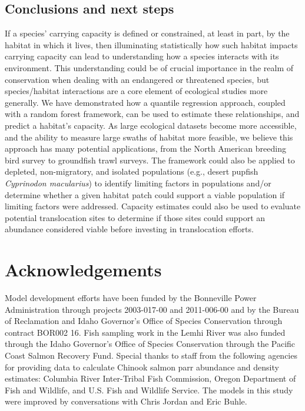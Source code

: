 \documentclass[
  12pt,
]{article}
\begin{document}
\hypertarget{conclusions-and-next-steps}{%
\subsection{Conclusions and next steps}\label{conclusions-and-next-steps}}

If a species' carrying capacity is defined or constrained, at least in part, by the habitat in which it lives, then illuminating statistically how such habitat impacts carrying capacity can lead to understanding how a species interacts with its environment. This understanding could be of crucial importance in the realm of conservation when dealing with an endangered or threatened species, but species/habitat interactions are a core element of ecological studies more generally. We have demonstrated how a quantile regression approach, coupled with a random forest framework, can be used to estimate these relationships, and predict a habitat's capacity. As large ecological datasets become more accessible, and the ability to measure large swaths of habitat more feasible, we believe this approach has many potential applications, from the North American breeding bird survey to groundfish trawl surveys. The framework could also be applied to depleted, non-migratory, and isolated populations (e.g., desert pupfish \emph{Cyprinodon macularius}) to identify limiting factors in populations and/or determine whether a given habitat patch could support a viable population if limiting factors were addressed. Capacity estimates could also be used to evaluate potential translocation sites to determine if those sites could support an abundance considered viable before investing in translocation efforts.

\hypertarget{acknowledgements}{%
\section{Acknowledgements}\label{acknowledgements}}

Model development efforts have been funded by the Bonneville Power Administration through projects 2003-017-00 and 2011-006-00 and by the Bureau of Reclamation and Idaho Governor's Office of Species Conservation through contract BOR002 16. Fish sampling work in the Lemhi River was also funded through the Idaho Governor's Office of Species Conservation through the Pacific Coast Salmon Recovery Fund. Special thanks to staff from the following agencies for providing data to calculate Chinook salmon parr abundance and density estimates: Columbia River Inter-Tribal Fish Commission, Oregon Department of Fish and Wildlife, and U.S. Fish and Wildlife Service. The models in this study were improved by conversations with Chris Jordan and Eric Buhle.
\end{document}
